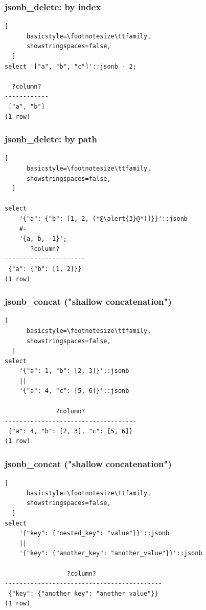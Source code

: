\documentclass[14pt, compress]{beamer}
\begin{document}
\begin{frame}[fragile]
  \frametitle{jsonb\_delete: by index}

  \begin{lstlisting}[
      basicstyle=\footnotesize\ttfamily,
      showstringspaces=false,
  ]
select '["a", "b", "c"]'::jsonb - 2;

  ?column?  
------------
 ["a", "b"]
(1 row)

  \end{lstlisting}
\end{frame}

\begin{frame}[fragile]
  \frametitle{jsonb\_delete: by path}

  \begin{lstlisting}[
      basicstyle=\footnotesize\ttfamily,
      showstringspaces=false,
  ]

select 
    '{"a": {"b": [1, 2, (*@\alert{3}@*)]}}'::jsonb
    #-
    '{a, b, -1}';
       ?column?       
----------------------
 {"a": {"b": [1, 2]}}
(1 row)

  \end{lstlisting}
\end{frame}

\begin{frame}[fragile]
\frametitle{jsonb\_concat ("shallow concatenation")}

  \begin{lstlisting}[
      basicstyle=\footnotesize\ttfamily,
      showstringspaces=false,
  ]
select 
    '{"a": 1, "b": [2, 3]}'::jsonb
    ||
    '{"a": 4, "c": [5, 6]}'::jsonb

              ?column?              
------------------------------------
 {"a": 4, "b": [2, 3], "c": [5, 6]}
(1 row)

  \end{lstlisting}
\end{frame}

\begin{frame}[fragile]
\frametitle{jsonb\_concat ("shallow concatenation")}

  \begin{lstlisting}[
      basicstyle=\footnotesize\ttfamily,
      showstringspaces=false,
  ]
select 
    '{"key": {"nested_key": "value"}}'::jsonb
    ||
    '{"key": {"another_key": "another_value"}}'::jsonb

                 ?column?                  
-------------------------------------------
 {"key": {"another_key": "another_value"}}
(1 row)

  \end{lstlisting}
\end{frame}
\end{document}

